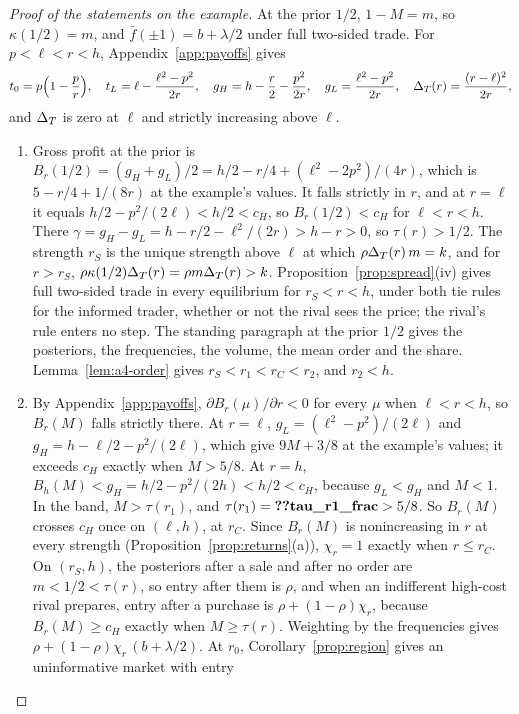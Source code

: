 \begin{proof}[Proof of the statements on the example]
At the prior \(1/2\), \(1-M=m\), so \(\kappa(1/2)=m\), and \(\bar f(\pm1)=b+\lambda/2\) under full two-sided trade.
For \(p<\ell<r<h\), Appendix~\ref{app:payoffs} gives
\[
t_0=p\Bigl(1-\frac pr\Bigr),\quad t_L=\ell-\frac{\ell^2-p^2}{2r},\quad
g_H=h-\frac r2-\frac{p^2}{2r},\quad g_L=\frac{\ell^2-p^2}{2r},\quad \Delta_T(r)=\frac{(r-\ell)^2}{2r},
\]
and \(\Delta_T\) is zero at \(\ell\) and strictly increasing above \(\ell\).
\begin{enumerate}[label=(\alph*),leftmargin=2em]
\item Gross profit at the prior is \(B_r(1/2)=(g_H+g_L)/2=h/2-r/4+(\ell^2-2p^2)/(4r)\), which is \(5-r/4+1/(8r)\) at the
example's values. It falls strictly in \(r\), and at \(r=\ell\) it equals \(h/2-p^2/(2\ell)<h/2<c_H\), so
\(B_r(1/2)<c_H\) for \(\ell<r<h\). There \(\gamma=g_H-g_L=h-r/2-\ell^2/(2r)>h-r>0\), so \(\tau(r)>1/2\). The strength
\(r_S\) is the unique strength above \(\ell\) at which \(\rho\Delta_T(r)\,m=k\), and for \(r>r_S\),
\(\rho\kappa(1/2)\Delta_T(r)=\rho m\Delta_T(r)>k\). Proposition~\ref{prop:spread}(iv) gives full two-sided trade in every
equilibrium for \(r_S<r<h\), under both tie rules for the informed trader, whether or not the rival sees the price; the rival's
rule enters no step. The standing paragraph at the prior \(1/2\) gives the posteriors, the frequencies, the volume, the
mean order and the share. Lemma~\ref{lem:a4-order} gives \(r_S<r_1<r_C<r_2\), and \(r_2<h\).
\item By Appendix~\ref{app:payoffs}, \(\partial B_r(\mu)/\partial r<0\) for every \(\mu\) when \(\ell<r<h\), so
\(B_r(M)\) falls strictly there. At \(r=\ell\), \(g_L=(\ell^2-p^2)/(2\ell)\) and \(g_H=h-\ell/2-p^2/(2\ell)\), which give
\(9M+3/8\) at the example's values; it exceeds \(c_H\) exactly when \(M>5/8\). At \(r=h\),
\(B_h(M)<g_H=h/2-p^2/(2h)<h/2<c_H\), because \(g_L<g_H\) and \(M<1\). In the band, \(M>\tau(r_1)\), and
\(\tau(r_1)=\reg{tau_r1_frac}>5/8\). So \(B_r(M)\) crosses \(c_H\) once on \((\ell,h)\), at \(r_C\). Since \(B_r(M)\) is
nonincreasing in \(r\) at every strength (Proposition~\ref{prop:returns}(a)), \(\chi_r=1\) exactly when \(r\le r_C\). On
\((r_S,h)\), the posteriors after a sale and after no order are \(m<1/2<\tau(r)\), so entry after them is \(\rho\), and
when an indifferent high-cost rival prepares, entry after a purchase is \(\rho+(1-\rho)\chi_r\), because
\(B_r(M)\ge c_H\) exactly when \(M\ge\tau(r)\). Weighting by the frequencies gives
\(\rho+(1-\rho)\chi_r\,(b+\lambda/2)\). At \(r_0\), Corollary~\ref{prop:region} gives an uninformative market with entry

\end{enumerate}
\end{proof}
